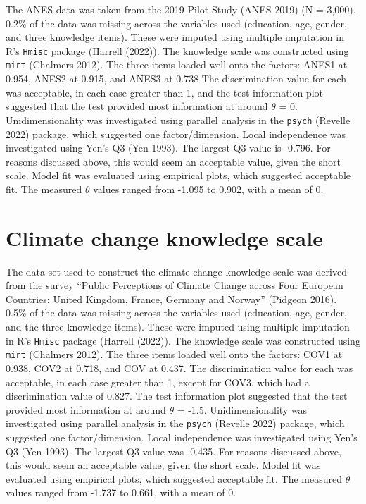 \documentclass[11pt,halfline,a4paper,]{ouparticle}
\begin{document}
The ANES data was taken from the 2019 Pilot Study (ANES 2019) (N =
3,000). 0.2\% of the data was missing across the variables used
(education, age, gender, and three knowledge items). These were imputed
using multiple imputation in R's \texttt{Hmisc} package (Harrell
(2022)). The knowledge scale was constructed using \texttt{mirt}
(Chalmers 2012). The three items loaded well onto the factors: ANES1 at
0.954, ANES2 at 0.915, and ANES3 at 0.738 The discrimination value for
each was acceptable, in each case greater than 1, and the test
information plot suggested that the test provided most information at
around \(\theta\) = 0. Unidimensionality was investigated using parallel
analysis in the \texttt{psych} (Revelle 2022) package, which suggested
one factor/dimension. Local independence was investigated using Yen's Q3
(Yen 1993). The largest Q3 value is -0.796. For reasons discussed above,
this would seem an acceptable value, given the short scale. Model fit
was evaluated using empirical plots, which suggested acceptable fit. The
measured \(\theta\) values ranged from -1.095 to 0.902, with a mean of
0.

\hypertarget{climate-change-knowledge-scale}{%
\section{Climate change knowledge
scale}\label{climate-change-knowledge-scale}}

The data set used to construct the climate change knowledge scale was
derived from the survey ``Public Perceptions of Climate Change across
Four European Countries: United Kingdom, France, Germany and Norway''
(Pidgeon 2016). 0.5\% of the data was missing across the variables used
(education, age, gender, and the three knowledge items). These were
imputed using multiple imputation in R's \texttt{Hmisc} package (Harrell
(2022)). The knowledge scale was constructed using \texttt{mirt}
(Chalmers 2012). The three items loaded well onto the factors: COV1 at
0.938, COV2 at 0.718, and COV at 0.437. The discrimination value for
each was acceptable, in each case greater than 1, except for COV3, which
had a discrimination value of 0.827. The test information plot suggested
that the test provided most information at around \(\theta\) = -1.5.
Unidimensionality was investigated using parallel analysis in the
\texttt{psych} (Revelle 2022) package, which suggested one
factor/dimension. Local independence was investigated using Yen's Q3
(Yen 1993). The largest Q3 value was -0.435. For reasons discussed
above, this would seem an acceptable value, given the short scale. Model
fit was evaluated using empirical plots, which suggested acceptable fit.
The measured \(\theta\) values ranged from -1.737 to 0.661, with a mean
of 0.
\end{document}
